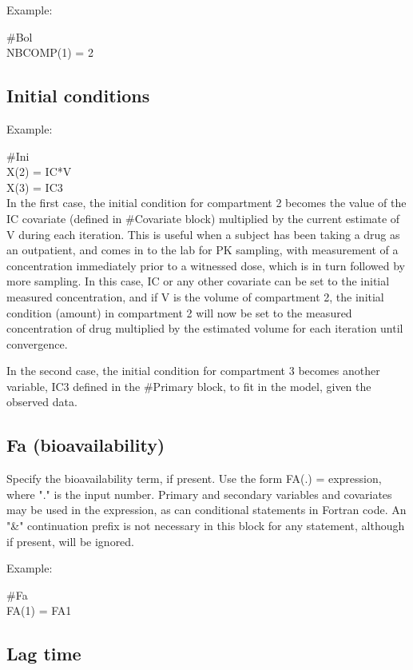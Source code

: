 \documentclass[
]{book}
\begin{document}
Example:

\#Bol\\
NBCOMP(1) = 2

\hypertarget{ini}{%
\subsection{Initial conditions}\label{ini}}

Example:

\#Ini\\
X(2) = IC*V\\
X(3) = IC3\\

In the first case, the initial condition for compartment 2 becomes the
value of the IC covariate (defined in \#Covariate block) multiplied by
the current estimate of V during each iteration. This is useful when a
subject has been taking a drug as an outpatient, and comes in to the lab
for PK sampling, with measurement of a concentration immediately prior
to a witnessed dose, which is in turn followed by more sampling. In this
case, IC or any other covariate can be set to the initial measured
concentration, and if V is the volume of compartment 2, the initial
condition (amount) in compartment 2 will now be set to the measured
concentration of drug multiplied by the estimated volume for each
iteration until convergence.

In the second case, the initial condition for compartment 3 becomes
another variable, IC3 defined in the \#Primary block, to fit in the
model, given the observed data.

\hypertarget{Fa}{%
\subsection{Fa (bioavailability)}\label{Fa}}

Specify the bioavailability term, if present. Use the form FA(.) =
expression, where "." is the input number. Primary and secondary
variables and covariates may be used in the expression, as can
conditional statements in Fortran code. An "\&" continuation prefix is
not necessary in this block for any statement, although if present, will
be ignored.

Example:

\#Fa\\
FA(1) = FA1

\hypertarget{lag}{%
\subsection{Lag time}\label{lag}}
\end{document}
